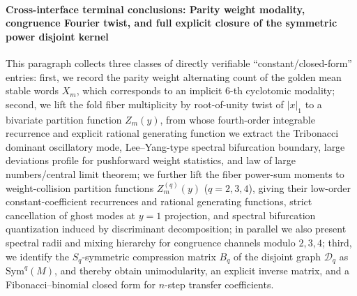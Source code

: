 
\paragraph{Cross-interface terminal conclusions: Parity weight modality, congruence Fourier twist, and full explicit closure of the symmetric power disjoint kernel}
This paragraph collects three classes of directly verifiable ``constant/closed-form'' entries:
first, we record the parity weight alternating count of the golden mean stable words \(X_m\),
which corresponds to an implicit \(6\)-th cyclotomic modality;
second, we lift the fold fiber multiplicity by root-of-unity twist of \(|x|_1\) to a bivariate partition function \(Z_m(y)\),
from whose fourth-order integrable recurrence and explicit rational generating function we extract the Tribonacci dominant oscillatory mode, Lee--Yang-type spectral bifurcation boundary, large deviations profile for pushforward weight statistics,
and law of large numbers/central limit theorem;
we further lift the fiber power-sum moments to weight-collision partition functions \(Z_m^{(q)}(y)\) (\(q=2,3,4\)),
giving their low-order constant-coefficient recurrences and rational generating functions, strict cancellation of ghost modes at \(y=1\) projection, and spectral bifurcation quantization induced by discriminant decomposition;
in parallel we also present spectral radii and mixing hierarchy for congruence channels modulo \(2,3,4\);
third, we identify the \(S_q\)-symmetric compression matrix \(B_q\) of the disjoint graph \(\mathcal D_q\) as \(\mathrm{Sym}^q(M)\),
and thereby obtain unimodularity, an explicit inverse matrix, and a Fibonacci--binomial closed form for \(n\)-step transfer coefficients.


